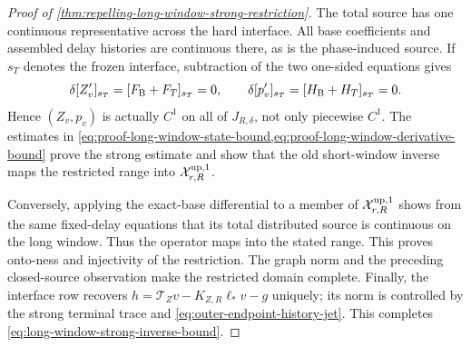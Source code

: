 \begin{proof}[Proof of
\cref{thm:repelling-long-window-strong-restriction}]
The total source has one continuous representative across the hard
interface.  All base coefficients and assembled delay histories are
continuous there, as is the phase-induced source.  If \(s_T\) denotes the
frozen interface, subtraction of the two one-sided equations gives
\begin{equation}
 \delta[Z_v']_{s_T}=[F_{\rm B}+F_T]_{s_T}=0,
 \qquad
 \delta[p_v']_{s_T}=[H_{\rm B}+H_T]_{s_T}=0.     \label{eq:proof-long-window-seam-jump}
\end{equation}
Hence \((Z_v,p_v)\) is actually \(C^1\) on all of \(J_{R,\delta}\), not
only piecewise \(C^1\).  The estimates in
\cref{eq:proof-long-window-state-bound,eq:proof-long-window-derivative-bound}
prove the strong estimate and show that the old short-window inverse maps the
restricted range into \(\mathcal X_{r,R}^{\rm up,1}\).

Conversely, applying the exact-base differential to a member of
\(\mathcal X_{r,R}^{\rm up,1}\) shows from the same fixed-delay equations
that its total distributed source is continuous on the long window.  Thus
the operator maps into the stated range.  This proves onto-ness and
injectivity of the restriction.  The graph norm and the preceding
closed-source observation make the restricted domain complete.  Finally,
the interface row recovers
\(h=\mathcal T_Zv-K_{Z,R}\ell_*v-g\) uniquely; its norm is controlled by
the strong terminal trace and
\cref{eq:outer-endpoint-history-jet}.  This completes
\cref{eq:long-window-strong-inverse-bound}.
\end{proof}

